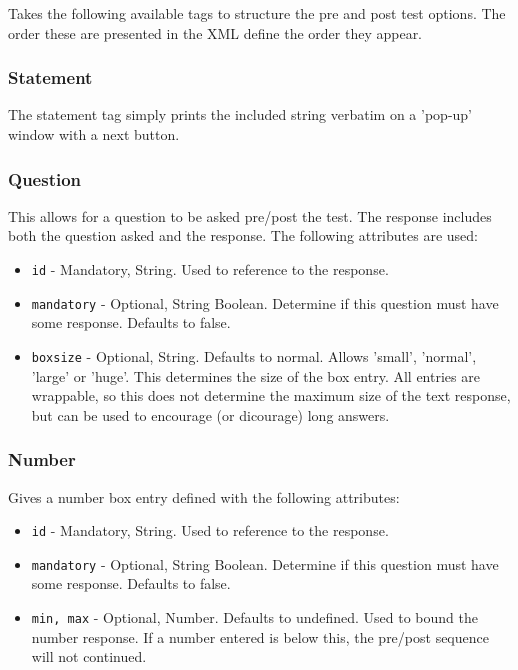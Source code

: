 \documentclass{article}
\begin{document}
Takes the following available tags to structure the pre and post test options. The order these are presented in the XML define the order they appear.

\subsubsection{Statement}

The statement tag simply prints the included string verbatim on a 'pop-up' window with a next button.

\subsubsection{Question}

This allows for a question to be asked pre/post the test. The response includes both the question asked and the response. The following attributes are used:
\begin{itemize}
\item \texttt{id} - Mandatory, String. Used to reference to the response.
\item \texttt{mandatory} - Optional, String Boolean. Determine if this question must have some response. Defaults to false.
\item \texttt{boxsize} - Optional, String. Defaults to normal. Allows 'small', 'normal', 'large' or 'huge'. This determines the size of the box entry. All entries are wrappable, so this does not determine the maximum size of the text response, but can be used to encourage (or dicourage) long answers.
\end{itemize}

\subsubsection{Number}

Gives a number box entry defined with the following attributes:
\begin{itemize}
\item \texttt{id} - Mandatory, String. Used to reference to the response.
\item \texttt{mandatory} - Optional, String Boolean. Determine if this question must have some response. Defaults to false.
\item \texttt{min, max} - Optional, Number. Defaults to undefined. Used to bound the number response. If a number entered is below this, the pre/post sequence will not continued.
\end{itemize}
\end{document}

